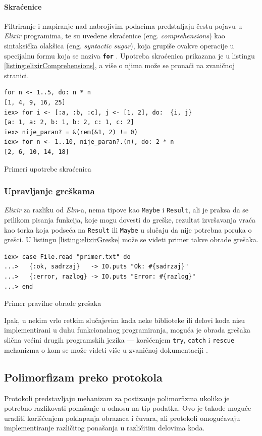 \documentclass[12pt,oneside]{memoir}
\begin{document}
\paragraph{Skraćenice}
Filtriranje i mapiranje nad nabrojivim podacima predstaljaju čestu pojavu u \emph{Elixir} programima,
te su uvedene skraćenice (eng. \emph{comprehensions}) kao sintaksička olakšica (eng. \emph{syntactic sugar}), koja
grupiše ovakve operacije u specijalnu formu koja se naziva \texttt{\textbf{for}} . Upotreba skraćenica
prikazana je u listingu \ref{listing:elixirComprehensions}, a više o njima može se pronaći na zvaničnoj
\cite{elixir} stranici.
\begin{listing}[!ht]
\begin{verbatim}
for n <- 1..5, do: n * n
[1, 4, 9, 16, 25]
iex> for i <- [:a, :b, :c], j <- [1, 2], do:  {i, j}
[a: 1, a: 2, b: 1, b: 2, c: 1, c: 2]
iex> nije_paran? = &(rem(&1, 2) != 0)
iex> for n <- 1..10, nije_paran?.(n), do: 2 * n
[2, 6, 10, 14, 18]
\end{verbatim}
\caption{Primeri upotrebe skraćenica}
\label{listing:elixirComprehensions}
\end{listing}
\subsubsection{Upravljanje greškama}
\emph{Elixir} za razliku od \emph{Elm}-a, nema tipove kao \texttt{Maybe} i \texttt{Result}, ali je praksa
da se prilikom pisanja funkcija, koje mogu dovesti do greške, rezultat izvršavanja vraća kao
torka koja podseća na \texttt{Result} ili \texttt{Maybe} u slučaju da nije potrebna poruka o
grešci. U listingu \ref{listing:elixirGreske} može se videti primer takve obrade grešaka.
\begin{listing}[!ht]
\begin{verbatim}
iex> case File.read "primer.txt" do
...>   {:ok, sadrzaj}   -> IO.puts "Ok: #{sadrzaj}"
...>   {:error, razlog} -> IO.puts "Error: #{razlog}"
...> end
\end{verbatim}
\caption{Primer pravilne obrade grešaka}
\label{listing:elixirGreske}
\end{listing}
Ipak, u nekim vrlo retkim slučajevim kada neke biblioteke ili delovi koda nisu implementirani
u duhu funkcionalnog programiranja, moguća je obrada grešaka slična većini drugih programskih
jezika --- koršćenjem \texttt{try}, \texttt{catch} i \texttt{rescue} mehanizma o kom se može
videti više u zvaničnoj dokumentaciji \cite{elixir}.
\subsection{Polimorfizam preko protokola}
Protokoli predstavljaju mehanizam za postizanje polimorfizma ukoliko je potrebno razlikovati
ponašanje u odnosu na tip podatka. Ovo je takođe moguće uraditi korišćenjem poklapanja
obrazaca i čuvara, ali protokoli omogućavaju implementiranje različitog ponašanja u
različitim delovima koda.
\end{document}
